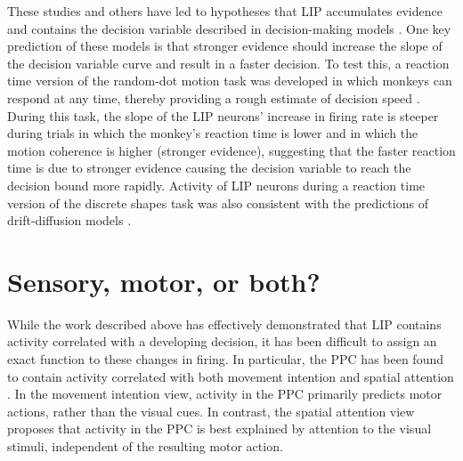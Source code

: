 \bigskip
These studies and others have led to hypotheses that LIP accumulates evidence and contains the decision variable described in decision-making models \citep{Mazurek:2003cm}. One key prediction of these models is that stronger evidence should increase the slope of the decision variable curve and result in a faster decision. To test this, a reaction time version of the random-dot motion task was developed in which monkeys can respond at any time, thereby providing a rough estimate of decision speed \citep{Roitman:2002wr}. During this task, the slope of the LIP neurons’ increase in firing rate is steeper during trials in which the monkey’s reaction time is lower and in which the motion coherence is higher (stronger evidence), suggesting that the faster reaction time is due to stronger evidence causing the decision variable to reach the decision bound more rapidly. Activity of LIP neurons during a reaction time version of the discrete shapes task was also consistent with the predictions of drift-diffusion models \citep{Kira:2015cl}.

\section{Sensory, motor, or both?} \label{intro:sensory_motor}

While the work described above has effectively demonstrated that LIP contains activity correlated with a developing decision, it has been difficult to assign an exact function to these changes in firing. In particular, the PPC has been found to contain activity correlated with both movement intention \citep{Andersen:2009tm, Buneo:2006gu, Cui:2007dm, QuianQuiroga:2006iz} and spatial attention \citep{Bisley:2010ci, Bisley:2003it, Ipata:2006gg, Balan:2006co, Kusunoki:2000gv}. In the movement intention view, activity in the PPC primarily predicts motor actions, rather than the visual cues. In contrast, the spatial attention view proposes that activity in the PPC is best explained by attention to the visual stimuli, independent of the resulting motor action. 


